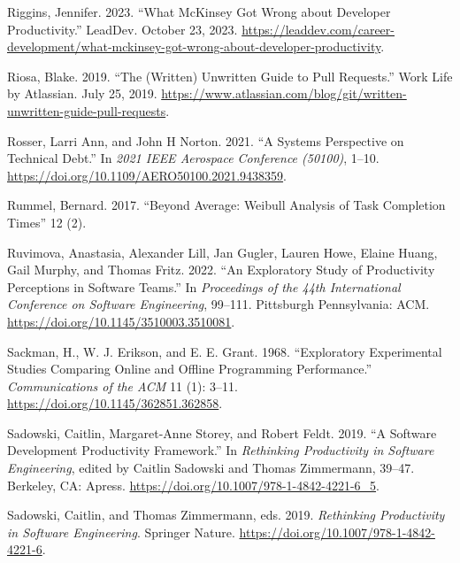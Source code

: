 \documentclass[
]{article}
\newlength{\cslhangindent}
\newenvironment{CSLReferences}[2] %
 {\begin{list}{}{%
  \setlength{\itemindent}{0pt}
  \setlength{\leftmargin}{0pt}
  \setlength{\parsep}{0pt}
  \ifodd #1
   \setlength{\leftmargin}{\cslhangindent}
   \setlength{\itemindent}{-1\cslhangindent}
  \fi
  \setlength{\itemsep}{#2\baselineskip}}}
 {\end{list}}
\begin{document}
\begin{CSLReferences}{1}{0}
Riggins, Jennifer. 2023. {``What {McKinsey} Got Wrong about Developer
Productivity.''} LeadDev. October 23, 2023.
\url{https://leaddev.com/career-development/what-mckinsey-got-wrong-about-developer-productivity}.

Riosa, Blake. 2019. {``The (Written) Unwritten Guide to Pull
Requests.''} Work Life by Atlassian. July 25, 2019.
\url{https://www.atlassian.com/blog/git/written-unwritten-guide-pull-requests}.

Rosser, Larri Ann, and John H Norton. 2021. {``A {Systems Perspective}
on {Technical Debt}.''} In \emph{2021 {IEEE Aerospace Conference}
(50100)}, 1--10. \url{https://doi.org/10.1109/AERO50100.2021.9438359}.

Rummel, Bernard. 2017. {``Beyond {Average}: {Weibull Analysis} of {Task
Completion Times}''} 12 (2).

Ruvimova, Anastasia, Alexander Lill, Jan Gugler, Lauren Howe, Elaine
Huang, Gail Murphy, and Thomas Fritz. 2022. {``An Exploratory Study of
Productivity Perceptions in Software Teams.''} In \emph{Proceedings of
the 44th {International Conference} on {Software Engineering}}, 99--111.
Pittsburgh Pennsylvania: ACM.
\url{https://doi.org/10.1145/3510003.3510081}.

Sackman, H., W. J. Erikson, and E. E. Grant. 1968. {``Exploratory
Experimental Studies Comparing Online and Offline Programming
Performance.''} \emph{Communications of the ACM} 11 (1): 3--11.
\url{https://doi.org/10.1145/362851.362858}.

Sadowski, Caitlin, Margaret-Anne Storey, and Robert Feldt. 2019. {``A
{Software Development Productivity Framework}.''} In \emph{Rethinking
{Productivity} in {Software Engineering}}, edited by Caitlin Sadowski
and Thomas Zimmermann, 39--47. Berkeley, CA: Apress.
\url{https://doi.org/10.1007/978-1-4842-4221-6_5}.

Sadowski, Caitlin, and Thomas Zimmermann, eds. 2019. \emph{Rethinking
{Productivity} in {Software Engineering}}. Springer Nature.
\url{https://doi.org/10.1007/978-1-4842-4221-6}.


\end{CSLReferences}
\end{document}
